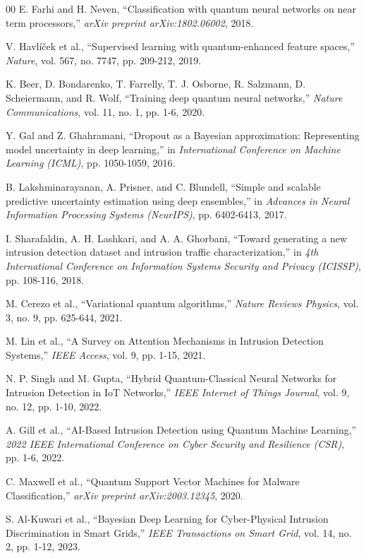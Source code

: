 \documentclass[conference]{IEEEtran}
\begin{document}
\begin{thebibliography}{00}
 E. Farhi and H. Neven, ``Classification with quantum neural networks on near term processors,'' \textit{arXiv preprint arXiv:1802.06002}, 2018.

 V. Havlíček et al., ``Supervised learning with quantum-enhanced feature spaces,'' \textit{Nature}, vol. 567, no. 7747, pp. 209-212, 2019.

 K. Beer, D. Bondarenko, T. Farrelly, T. J. Osborne, R. Salzmann, D. Scheiermann, and R. Wolf, ``Training deep quantum neural networks,'' \textit{Nature Communications}, vol. 11, no. 1, pp. 1-6, 2020.

 Y. Gal and Z. Ghahramani, ``Dropout as a Bayesian approximation: Representing model uncertainty in deep learning,'' in \textit{International Conference on Machine Learning (ICML)}, pp. 1050-1059, 2016.

 B. Lakshminarayanan, A. Prisner, and C. Blundell, ``Simple and scalable predictive uncertainty estimation using deep ensembles,'' in \textit{Advances in Neural Information Processing Systems (NeurIPS)}, pp. 6402-6413, 2017.

 I. Sharafaldin, A. H. Lashkari, and A. A. Ghorbani, ``Toward generating a new intrusion detection dataset and intrusion traffic characterization,'' in \textit{4th International Conference on Information Systems Security and Privacy (ICISSP)}, pp. 108-116, 2018.

 M. Cerezo et al., ``Variational quantum algorithms,'' \textit{Nature Reviews Physics}, vol. 3, no. 9, pp. 625-644, 2021.

 M. Lin et al., ``A Survey on Attention Mechanisms in Intrusion Detection Systems,'' \textit{IEEE Access}, vol. 9, pp. 1-15, 2021.

 N. P. Singh and M. Gupta, ``Hybrid Quantum-Classical Neural Networks for Intrusion Detection in IoT Networks,'' \textit{IEEE Internet of Things Journal}, vol. 9, no. 12, pp. 1-10, 2022.

 A. Gill et al., ``AI-Based Intrusion Detection using Quantum Machine Learning,'' \textit{2022 IEEE International Conference on Cyber Security and Resilience (CSR)}, pp. 1-6, 2022.

 C. Maxwell et al., ``Quantum Support Vector Machines for Malware Classification,'' \textit{arXiv preprint arXiv:2003.12345}, 2020.

 S. Al-Kuwari et al., ``Bayesian Deep Learning for Cyber-Physical Intrusion Discrimination in Smart Grids,'' \textit{IEEE Transactions on Smart Grid}, vol. 14, no. 2, pp. 1-12, 2023.


\end{thebibliography}
\end{document}
